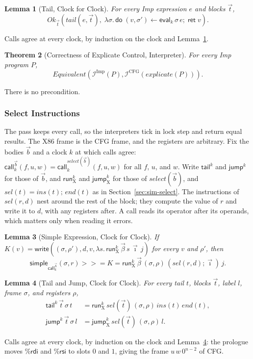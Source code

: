 \documentclass[10pt]{article}
\theoremstyle{acmplain}
\newtheorem{theorem}{Theorem}[section]
\newtheorem{lemma}[theorem]{Lemma}
\newcommand{\key}[1]{\mathsf{#1}}
\newcommand{\pass}[1]{\mathit{#1}}
\newcommand{\Equiv}{\mathit{Equivalent}}
\newcommand{\Ret}{\key{ret}\;}
\newcommand{\bind}{\mathbin{>\!\!>\!\!=}}
\newcommand{\Do}{\key{do}\;}
\newcommand{\EV}[2]{\key{eval}^{#1}_{#2}}
\newcommand{\CALL}[2]{\key{call}^{#1}_{#2}}
\newcommand{\Interp}[1]{\mathcal{I}^{#1}}
\newcommand{\rdi}{\%\key{rdi}}
\newcommand{\rsi}{\%\key{rsi}}
\begin{document}
\begin{lemma}[Tail, Clock for Clock]\label{lem:tail-ok}
For every Imp expression $e$ and blocks $\vec{t}$,
\[
  \mathit{Ok}_{\vec{t}}(\pass{tail}(e, \vec{t}),\;
    \lambda \sigma.\, \Do (v, \sigma') \leftarrow \EV{}{k}\,\sigma\,e;\; \Ret v) .
\]
\end{lemma}
Calls agree at every clock, by induction on the clock and
Lemma~\ref{lem:tail-ok}.

\begin{theorem}[Correctness of Explicate Control, Interpreter]\label{thm:explicate-clk}
For every Imp program $P$,
\[
  \Equiv(\Interp{\mathrm{Imp}}(P), \Interp{\mathrm{CFG}}(\pass{explicate}(P))) .
\]
\end{theorem}
There is no precondition.

\subsubsection{Select Instructions}

The pass keeps every call, so the interpreters tick in lock step and
return equal results. The X86 frame is the CFG frame, and the
registers are arbitrary. Fix the bodies $\vec{b}$ and a clock $k$ at
which calls agree:
$\CALL{\vec{b}}{k}(f, u, w) = \CALL{\pass{select}(\vec{b})}{k}(f, u, w)$
for all $f$, $u$, and $w$. Write $\key{tail}^k$ and
$\key{jump}^k$ for those of $\vec{b}$, and $\key{run}^k_{\mathrm{X}}$ and
$\key{jump}^k_{\mathrm{X}}$ for those of $\pass{select}(\vec{b})$, and
$\pass{sel}(t) = \mathit{ins}(t);\, \mathit{end}(t)$ as in
Section~\ref{sec:sim-select}. The
instructions of $\pass{sel}(r, d)$ nest around the rest of the block;
they compute the value of $r$ and write it to $d$, with any registers
after. A call reads its operator after its operands, which matters only
when reading it errors.

\begin{lemma}[Simple Expression, Clock for Clock]\label{lem:simple-ok}
If $K(v) = \key{write}((\sigma, \rho'), d, v, \lambda s.\, \key{run}^k_{\mathrm{X}}\,\vec{\beta}\,s\,\vec{\imath}\,j)$
for every $v$ and $\rho'$, then
\[
  \key{simple}_{\CALL{\vec{b}}{k}}(\sigma, r) \bind K =
  \key{run}^k_{\mathrm{X}}\,\vec{\beta}\,(\sigma, \rho)\,(\pass{sel}(r, d); \vec{\imath})\,j .
\]
\end{lemma}

\begin{lemma}[Tail and Jump, Clock for Clock]\label{lem:sel-tail-ok}
For every tail $t$, blocks $\vec{t}$, label $l$, frame $\sigma$, and registers $\rho$,
\begin{align*}
  \key{tail}^k\,\vec{t}\,\sigma\,t &= \key{run}^k_{\mathrm{X}}\,\pass{sel}(\vec{t})\,(\sigma, \rho)\,\mathit{ins}(t)\,\mathit{end}(t) , \\
  \key{jump}^k\,\vec{t}\,\sigma\,l &= \key{jump}^k_{\mathrm{X}}\,\pass{sel}(\vec{t})\,(\sigma, \rho)\,l .
\end{align*}
\end{lemma}
Calls agree at every clock, by induction on the clock and
Lemma~\ref{lem:sel-tail-ok}: the prologue moves $\rdi$ and $\rsi$ to
slots $0$ and $1$, giving the frame $u\, w\, 0^{n-2}$ of CFG.
\end{document}
